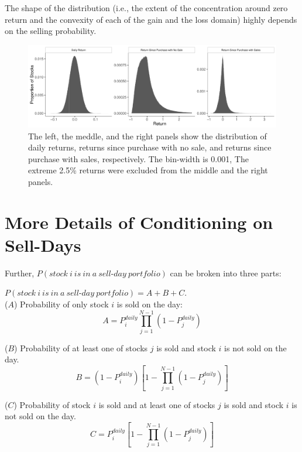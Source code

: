 \documentclass[11pt, a4paper]{article}
\begin{document}
\begin{appendices}
The shape of the distribution (i.e., the extent of the concentration around zero return and the convexity of each of the gain and the loss domain) highly depends on the selling probability.



\begin{figure}[H]
	\centering
	\includegraphics[width=1\columnwidth]{return_dist.pdf}
	\caption{The left, the meddle, and the right panels show the distribution of daily returns, returns since purchase with no sale, and returns since purchase with sales, respectively. The bin-width is 0.001, The extreme 2.5\% returns were excluded from the middle and the right panels.}
	\label{figure:ret}
\end{figure}

\clearpage
\section{More Details of Conditioning on Sell-Days}
\label{section:more_details}

Further, $P(stock~i~is~in~a~sell\mbox{-}day~portfolio)$ can be broken into three parts:

$P(stock~i~is~in~a~sell\mbox{-}day~portfolio) = A+B+C$.\\

\noindent
($A$) Probability of only stock $i$ is sold on the day: 
\begin{equation}
\label{eq:A}
A = P^{daily}_{i}\prod_{j=1}^{N-1}(1-P^{daily}_{j})
\end{equation}


\noindent
($B$) Probability of at least one of stocks $j$ is sold and stock $i$ is not sold on the day.
\begin{equation}
\label{eq:B}
B = (1-P^{daily}_{i})[1-\prod_{j=1}^{N-1}(1-P^{daily}_{j})]
\end{equation}

\noindent
($C$) Probability of stock $i$ is sold and at least one of stocks $j$ is sold and stock $i$ is not sold on the day.
\begin{equation}
\label{eq:C}
C = P^{daily}_{i}[1-\prod_{j=1}^{N-1}(1-P^{daily}_{j})]
\end{equation}


\end{appendices}
\end{document}
